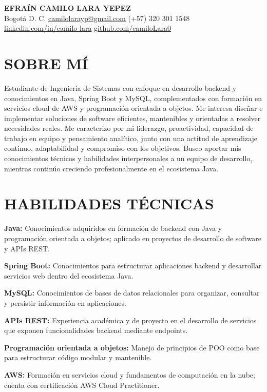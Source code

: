 \documentclass[10pt,a4paper]{article}
\begin{document}
\begin{center}
    {\Large\textbf{EFRAÍN CAMILO LARA YEPEZ}}\\[3pt]
    Bogotá D. C. \textbar{} \href{mailto:camilolarayp@gmail.com}{camilolarayp@gmail.com}
    \textbar{} (+57) 320 301 1548\\[2pt]
    \href{https://www.linkedin.com/in/camilo-lara}{linkedin.com/in/camilo-lara}
    \textbar{}
    \href{https://github.com/camiloLara0}{github.com/camiloLara0}
\end{center}

\section*{SOBRE MÍ}
Estudiante de Ingeniería de Sistemas con enfoque en desarrollo backend y conocimientos en Java, Spring Boot y MySQL, complementados con formación en servicios cloud de AWS y programación orientada a objetos. Me interesa diseñar e implementar soluciones de software eficientes, mantenibles y orientadas a resolver necesidades reales. Me caracterizo por mi liderazgo, proactividad, capacidad de trabajo en equipo y pensamiento analítico, junto con una actitud de aprendizaje continuo, adaptabilidad y compromiso con los objetivos. Busco aportar mis conocimientos técnicos y habilidades interpersonales a un equipo de desarrollo, mientras continúo creciendo profesionalmente en el ecosistema Java.

\section*{HABILIDADES TÉCNICAS}
\textbf{Java:} Conocimientos adquiridos en formación de backend con Java y programación orientada a objetos; aplicado en proyectos de desarrollo de software y APIs REST.

\textbf{Spring Boot:} Conocimientos para estructurar aplicaciones backend y desarrollar servicios web dentro del ecosistema Java.

\textbf{MySQL:} Conocimientos de bases de datos relacionales para organizar, consultar y persistir información en aplicaciones.

\textbf{APIs REST:} Experiencia académica y de proyecto en el desarrollo de servicios que exponen funcionalidades backend mediante endpoints.

\textbf{Programación orientada a objetos:} Manejo de principios de POO como base para estructurar código modular y mantenible.

\textbf{AWS:} Formación en servicios cloud y fundamentos de computación en la nube; cuenta con certificación AWS Cloud Practitioner.
\end{document}

